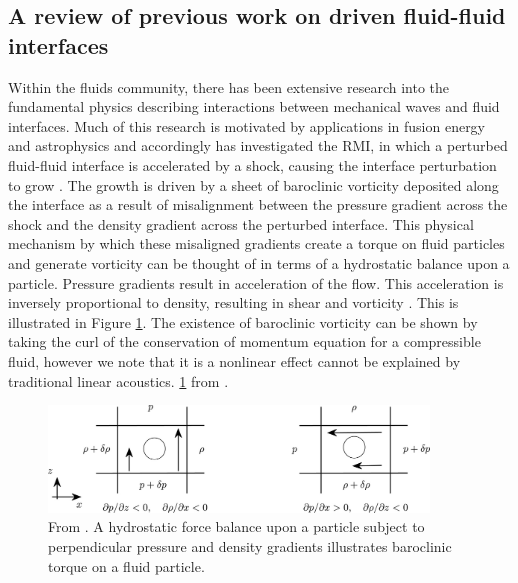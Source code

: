 \subsection{A review of previous work on driven fluid-fluid interfaces}
\label{subsec:usbe_lung_fluids_intro}
Within the fluids community, there has been extensive research into
the fundamental physics describing interactions between mechanical
waves and fluid interfaces. Much of this research is motivated by
applications in fusion energy and astrophysics and accordingly has
investigated the \ac{RMI}, in which a perturbed fluid-fluid interface
is accelerated by a shock, causing the interface perturbation to grow
\citep{Brouillette2002,Drake2006}. The growth is driven by a sheet of
baroclinic vorticity deposited along the interface as a result of
misalignment between the pressure gradient across the shock and the
density gradient across the perturbed interface. This physical
mechanism by which these misaligned gradients create a torque on fluid
particles and generate vorticity can be thought of in terms of a
hydrostatic balance upon a particle. Pressure gradients result in
acceleration of the flow. This acceleration is inversely proportional
to density, resulting in shear and vorticity \cite{Heifetz2015}. This
is illustrated in Figure \ref{fig:usbe_lung_baroclinic_schematic}.
The existence of baroclinic vorticity can be shown by taking the curl
of the conservation of momentum equation for a compressible fluid,
however we note that it is a nonlinear effect cannot be explained by
traditional linear acoustics.
\ref{fig:usbe_lung_baroclinic_schematic} from \cite{Heifetz2015}.
\begin{figure}
  \centering
  \includegraphics[width=0.9\textwidth]{./figs/lung_figs/baroclinic_schematic} \hfill
 \caption[A schematic of baroclinic torque]{From
    \cite{Heifetz2015}. A hydrostatic force balance upon a particle
    subject to perpendicular pressure and density gradients
    illustrates baroclinic torque on a fluid particle.}
  \label{fig:usbe_lung_baroclinic_schematic}
\end{figure}


